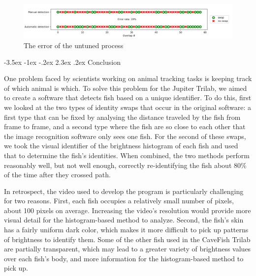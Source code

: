\documentclass{article}
\makeatletter
\renewcommand\section{\clearpage\newpage\@startsection {section}{1}{\z@}%
	{-3.5ex \@plus -1ex \@minus -.2ex}%
	{2.3ex \@plus.2ex}%
	{\normalfont\Large\bfseries}}
\makeatother
\begin{document}
\begin{figure}[H]
	\centering
	\includegraphics[width=\linewidth]{error}
	\caption{The error of the untuned process}
	\label{fig:error-rate}
\end{figure}





\section{Conclusion}

One problem faced by scientists working on animal tracking tasks is keeping track of which animal is which. To solve this problem for the Jupiter Trilab, we aimed to create a software that detects fish based on a unique identifier. To do this, first we looked at the two types of identity swaps that occur in the original software: a first type that can be fixed by analysing the distance traveled by the fish from frame to frame, and a second type where the fish are so close to each other that the image recognition software only sees one fish. For the second of these swaps, we took the visual identifier of the brightness histogram of each fish and used that to determine the fish's identities. When combined, the two methods perform reasonably well, but not well enough, correctly re-identifying the fish about 80\% of the time after they crossed path. 

In retrospect, the video used to develop the program is particularly challenging for two reasons. First, each fish occupies a relatively small number of pixels, about 100 pixels on average. Increasing the video's resolution would provide more visual detail for the histogram-based method to analyze.
Second, the fish's skin has a fairly uniform dark color, which makes it more difficult to pick up patterns of brightness to identify them. Some of the other fish used in the CaveFish Trilab are partially transparent, which may lead to a greater variety of brightness values over each fish's body, and more information for the histogram-based method to pick up.
\end{document}
